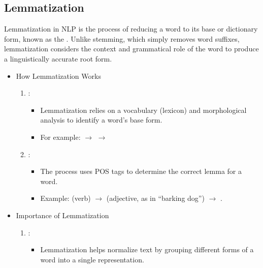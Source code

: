\documentclass[letterpaper,11pt,english]{sphinxmanual}
\begin{document}
\subsection{Lemmatization}
\label{\detokenize{prelim:lemmatization}}
\sphinxAtStartPar
Lemmatization in NLP is the process of reducing a word to its base or dictionary form, known as
the . Unlike stemming, which simply removes word suffixes, lemmatization considers
the context and grammatical role of the word to produce a linguistically accurate root form.
\begin{itemize}
\item {} 
\sphinxAtStartPar
How Lemmatization Works
\begin{enumerate}
%
\item {} 
\sphinxAtStartPar
{}:
\begin{itemize}
\item {} 
\sphinxAtStartPar
Lemmatization relies on a vocabulary (lexicon) and morphological analysis to identify a word’s base form.

\item {} 
\sphinxAtStartPar
For example:
\sphinxhyphen{}  \(\rightarrow\) 
\sphinxhyphen{}  \(\rightarrow\) 

\end{itemize}

\item {} 
\sphinxAtStartPar
{}:
\begin{itemize}
\item {} 
\sphinxAtStartPar
The process uses POS tags to determine the correct lemma for a word.

\item {} 
\sphinxAtStartPar
Example:
\sphinxhyphen{}  (verb) \(\rightarrow\) 
\sphinxhyphen{}  (adjective, as in “barking dog”) \(\rightarrow\) .

\end{itemize}

\end{enumerate}

\item {} 
\sphinxAtStartPar
Importance of Lemmatization
\begin{enumerate}
%
\item {} 
\sphinxAtStartPar
{}:
\begin{itemize}
\item {} 
\sphinxAtStartPar
Lemmatization helps normalize text by grouping different forms of a word into a single representation.


\end{itemize}
\end{enumerate}
\end{itemize}
\end{document}
